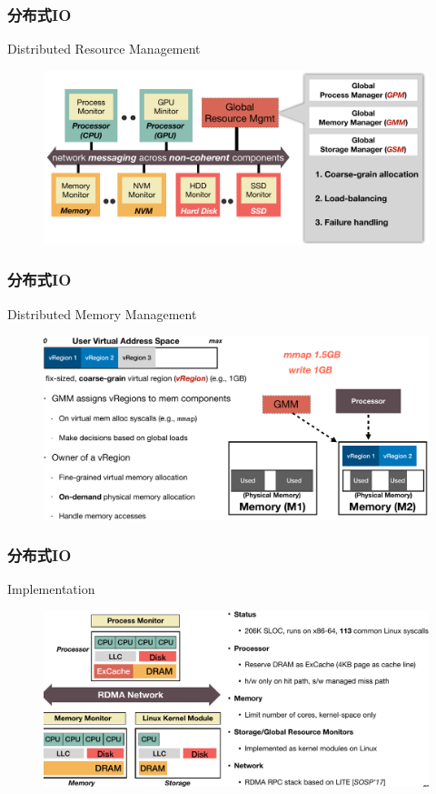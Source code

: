 \begin{frame}[fragile]
    \frametitle{分布式IO}
    Distributed Resource Management
    
    \begin{figure}
        \includegraphics[width=0.9\linewidth]{figs/disio-resource.png}
    \end{figure}
\end{frame}

\begin{frame}[fragile]
    \frametitle{分布式IO}
    Distributed Memory Management
    \begin{figure}
        \includegraphics[width=0.9\linewidth]{figs/disio-dmm.png}
    \end{figure}
\end{frame}


\begin{frame}[fragile]
    \frametitle{分布式IO}
    Implementation
    \begin{figure}
        \includegraphics[width=0.9\linewidth]{figs/disio-impl.png}
    \end{figure}
\end{frame}

